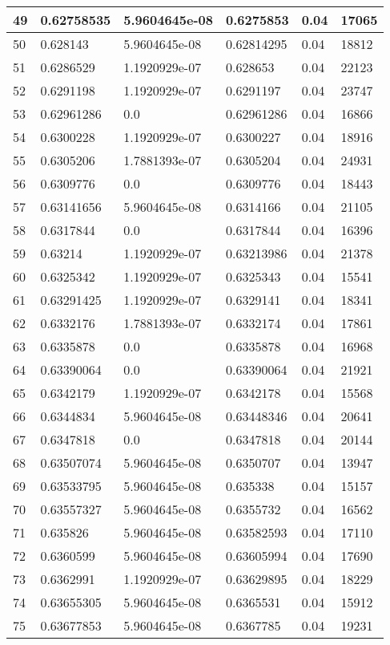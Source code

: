 \begin{longtable}{|l|l|l|l|l|l|}
49 & 0.62758535 & 5.9604645e-08 & 0.6275853 & 0.04 & 17065 \\ \hline 
50 & 0.628143 & 5.9604645e-08 & 0.62814295 & 0.04 & 18812 \\ \hline 
51 & 0.6286529 & 1.1920929e-07 & 0.628653 & 0.04 & 22123 \\ \hline 
52 & 0.6291198 & 1.1920929e-07 & 0.6291197 & 0.04 & 23747 \\ \hline 
53 & 0.62961286 & 0.0 & 0.62961286 & 0.04 & 16866 \\ \hline 
54 & 0.6300228 & 1.1920929e-07 & 0.6300227 & 0.04 & 18916 \\ \hline 
55 & 0.6305206 & 1.7881393e-07 & 0.6305204 & 0.04 & 24931 \\ \hline 
56 & 0.6309776 & 0.0 & 0.6309776 & 0.04 & 18443 \\ \hline 
57 & 0.63141656 & 5.9604645e-08 & 0.6314166 & 0.04 & 21105 \\ \hline 
58 & 0.6317844 & 0.0 & 0.6317844 & 0.04 & 16396 \\ \hline 
59 & 0.63214 & 1.1920929e-07 & 0.63213986 & 0.04 & 21378 \\ \hline 
60 & 0.6325342 & 1.1920929e-07 & 0.6325343 & 0.04 & 15541 \\ \hline 
61 & 0.63291425 & 1.1920929e-07 & 0.6329141 & 0.04 & 18341 \\ \hline 
62 & 0.6332176 & 1.7881393e-07 & 0.6332174 & 0.04 & 17861 \\ \hline 
63 & 0.6335878 & 0.0 & 0.6335878 & 0.04 & 16968 \\ \hline 
64 & 0.63390064 & 0.0 & 0.63390064 & 0.04 & 21921 \\ \hline 
65 & 0.6342179 & 1.1920929e-07 & 0.6342178 & 0.04 & 15568 \\ \hline 
66 & 0.6344834 & 5.9604645e-08 & 0.63448346 & 0.04 & 20641 \\ \hline 
67 & 0.6347818 & 0.0 & 0.6347818 & 0.04 & 20144 \\ \hline 
68 & 0.63507074 & 5.9604645e-08 & 0.6350707 & 0.04 & 13947 \\ \hline 
69 & 0.63533795 & 5.9604645e-08 & 0.635338 & 0.04 & 15157 \\ \hline 
70 & 0.63557327 & 5.9604645e-08 & 0.6355732 & 0.04 & 16562 \\ \hline 
71 & 0.635826 & 5.9604645e-08 & 0.63582593 & 0.04 & 17110 \\ \hline 
72 & 0.6360599 & 5.9604645e-08 & 0.63605994 & 0.04 & 17690 \\ \hline 
73 & 0.6362991 & 1.1920929e-07 & 0.63629895 & 0.04 & 18229 \\ \hline 
74 & 0.63655305 & 5.9604645e-08 & 0.6365531 & 0.04 & 15912 \\ \hline 
75 & 0.63677853 & 5.9604645e-08 & 0.6367785 & 0.04 & 19231 \\ \hline 
\end{longtable}